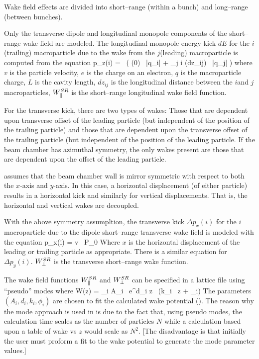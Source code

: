 Wake field effects are divided into short--range (within a bunch) and
long--range (between bunches).

Only the transverse dipole and longitudinal monopole components of the
short--range wake field are modeled. The longitudinal monopole energy
kick $dE$ for the $i$\Th (trailing) macroparticle due to the wake from
the $j$\Th (leading) macroparticle is computed from the equation
\Begineq
  \Delta p_z(i) =  \, \left(
        \WlS(0) \,  |q_i| +
        \sum_{j \ne i} \WlS(dz_{ij}) \, |q_j| \right)
  \label{delvp}
\Endeq
where $v$ is the particle velocity, $e$ is the charge on an electron,
$q$ is the macroparticle charge, $L$ is the cavity length, $dz_{ij}$
is the longitudinal distance between the $i$\Th and $j$\Th
macroparticles, $W^{SR}_\parallel$ is the short--range longitudinal wake field
function.

For the transverse kick, there are two types of wakes: Those that are
dependent upon transverse offset of the leading particle (but
independent of the position of the trailing particle) and those that
are dependent upon the transverse offset of the trailing particle (but
independent of the position of the leading particle. If the beam
chamber has azimuthal symmetry, the only wakes present are those that
are dependent upon the offset of the leading particle. 

\bmad assumes that the beam chamber wall is mirror symmetric with
respect to both the $x$-axis and $y$-axis. In this case, a horizontal
displacement (of either particle) results in a horizontal kick and
similarly for vertical displacements. That is, the horizontal and
vertical wakes are decoupled. 

With the above symmetry assumpltion, 
the transverse kick $\Delta p_x(i)$ for the $i$\Th macroparticle due to the 
dipole short--range transverse wake field is modeled with the equation
\Begineq
  \Delta p_x(i) = 
                 {v \, P_0}
  \label{pelqxw}
\Endeq
Where $x$ is the horizontal displacement of the leading or trailing
particle as appropriate. There is a similar equation for $\Delta
p_y(i)$. $W^{SR}_\perp$ is the transverse short--range wake function.

The wake field functions $W^{SR}_\parallel$ and $W^{SR}_\perp$ can be specified in a \bmad
lattice file using ``pseudo'' modes where
\Begineq
  W(z) = \sum_i A_i \, e^{d_i z} \, \sin (k_i \, z + \phi_i)
  \label{wadzk}
\Endeq
The parameters $(A_i, d_i, k_i, \phi_i)$ are chosen to fit the calculated wake potential
(). The reason why the mode approach is used in \bmad is due to the
fact that, using pseudo modes, the calculation time scales as the number of particles $N$
while a calculation based upon a table of wake vs $z$ would scale as $N^2$. [The
disadvantage is that initially the user must proform a fit to the wake potential to
generate the mode parameter values.]

